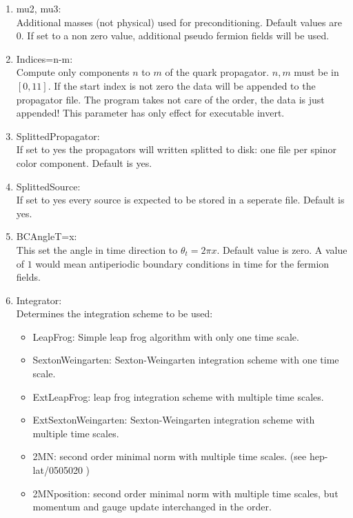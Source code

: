 \begin{enumerate}
\item {\ttfamily mu2, mu3}:\\
  Additional masses (not physical) used for preconditioning. Default values are
  $0$. If set to a non zero value, additional pseudo fermion fields
  will be used.

\item {\ttfamily Indices=n-m}:\\
  Compute only components $n$ to $m$ of the quark propagator. $n,m$ must
  be in $[0,11]$. If the start index is not zero the data will be
  appended to the propagator file. The program takes not care of the
  order, the data is just appended! This parameter has only
  effect for executable {\ttfamily invert}.

\item {\ttfamily SplittedPropagator}:\\
  If set to yes the propagators will written splitted to disk: one
  file per spinor color component. Default is {\ttfamily yes}.

\item {\ttfamily SplittedSource}:\\
  If set to yes every source is expected to be stored in a seperate file.
  Default is {\ttfamily yes}.


\item {\ttfamily BCAngleT=x}:\\
  This set the angle in
  time direction to $\theta_t = 2\pi x$. Default value is
  zero. A value of $1$ would mean antiperiodic boundary conditions in
  time for the fermion fields.

\item {\ttfamily Integrator}:\\
  Determines the integration scheme to be used:
  \begin{itemize}
  \item {\ttfamily LeapFrog}: Simple leap frog algorithm with only one
    time scale. 
  \item {\ttfamily SextonWeingarten}: Sexton-Weingarten integration
    scheme with one time scale.
  \item {\ttfamily ExtLeapFrog}: leap frog integration scheme with
    multiple time scales.
  \item {\ttfamily ExtSextonWeingarten}: Sexton-Weingarten integration scheme with
    multiple time scales.
  \item {\ttfamily 2MN}: second order minimal norm with multiple time
    scales. (see {\ttfamily hep-lat/0505020} )
  \item {\ttfamily 2MNposition}: second order minimal norm with
    multiple time scales, but momentum and gauge update interchanged
    in the order.
  \end{itemize}


\end{enumerate}
